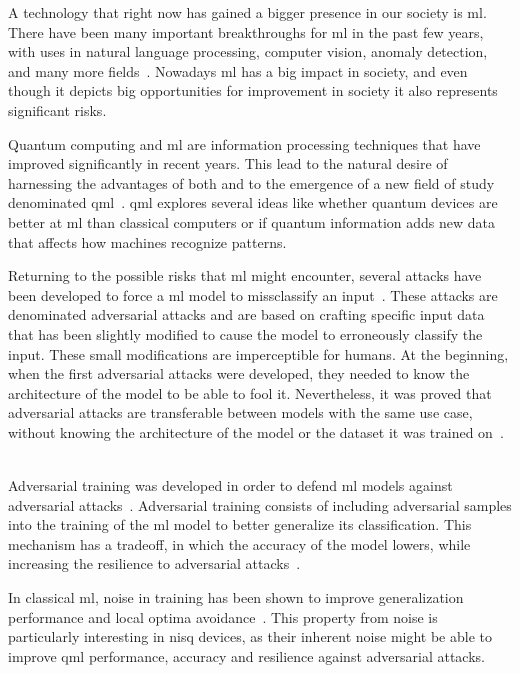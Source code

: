 A technology that right now has gained a bigger presence in our society is \ac{ml}.
There have been many important breakthroughs for \ac{ml} in the past few years, with
uses in natural language processing, computer vision, anomaly detection, and many
more fields~\cite{bommasani_opportunities_2022}. Nowadays \ac{ml} has a big impact
in society, and even though it depicts big opportunities for improvement in
society it also represents significant risks. \

Quantum computing and \ac{ml} are information processing techniques that have
improved significantly in recent years. This lead to the natural desire of
harnessing the advantages of both and to the emergence of a new field of study
denominated \ac{qml}~\cite{schuld_machine_2021}. \ac{qml} explores several ideas
like whether quantum devices are better at \ac{ml} than classical computers or
if quantum information adds new data that affects how machines recognize patterns. \

Returning to the possible risks that \ac{ml} might encounter, several attacks have
been developed to force a \ac{ml} model to missclassify an input~\cite{szegedy_intriguing_2014}.
These attacks are denominated adversarial attacks and are based on crafting specific
input data that has been slightly modified to cause the model to erroneously classify
the input. These small modifications are imperceptible for humans. At the beginning,
when the first adversarial attacks were developed, they needed to know the
architecture of the model to be able to fool it. Nevertheless, it was proved
that adversarial attacks are transferable between models with the same use
case, without knowing the architecture of the model or the dataset it was
trained on~\cite{papernot_transferability_2016}. \

Adversarial training was developed in order to defend \ac{ml} models against
adversarial attacks~\cite{goodfellow_explaining_2015, szegedy_intriguing_2014}.
Adversarial training consists of including adversarial samples into the training
of the \ac{ml} model to better generalize its classification. This mechanism
has a tradeoff, in which the accuracy of the model lowers, while increasing the
resilience to adversarial attacks~\cite{kurakin_adversarial_2017}. \

In classical \ac{ml}, noise in training has been shown to improve generalization
performance and local optima avoidance~\cite{ciliberto_quantum_2018}. This
property from noise is particularly interesting in \ac{nisq} devices, as their
inherent noise might be able to improve \ac{qml} performance, accuracy and
resilience against adversarial attacks. \

